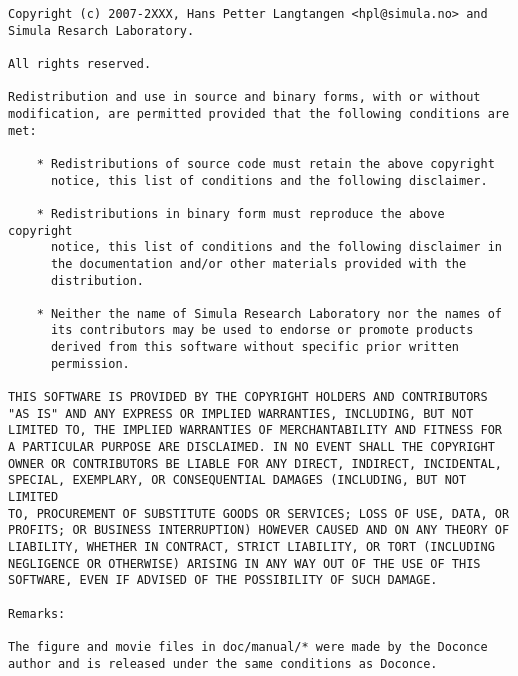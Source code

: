 \documentclass[%
oneside,                 %
final,                   %
chapterprefix=true,      %
open=right,              %
10pt]{book}
\begin{document}
\begin{Verbatim}[numbers=none,fontsize=\fontsize{9pt}{9pt},baselinestretch=0.95]
Copyright (c) 2007-2XXX, Hans Petter Langtangen <hpl@simula.no> and
Simula Resarch Laboratory.

All rights reserved.

Redistribution and use in source and binary forms, with or without
modification, are permitted provided that the following conditions are
met:

    * Redistributions of source code must retain the above copyright
      notice, this list of conditions and the following disclaimer.

    * Redistributions in binary form must reproduce the above copyright
      notice, this list of conditions and the following disclaimer in
      the documentation and/or other materials provided with the
      distribution.

    * Neither the name of Simula Research Laboratory nor the names of
      its contributors may be used to endorse or promote products
      derived from this software without specific prior written
      permission.

THIS SOFTWARE IS PROVIDED BY THE COPYRIGHT HOLDERS AND CONTRIBUTORS
"AS IS" AND ANY EXPRESS OR IMPLIED WARRANTIES, INCLUDING, BUT NOT
LIMITED TO, THE IMPLIED WARRANTIES OF MERCHANTABILITY AND FITNESS FOR
A PARTICULAR PURPOSE ARE DISCLAIMED. IN NO EVENT SHALL THE COPYRIGHT
OWNER OR CONTRIBUTORS BE LIABLE FOR ANY DIRECT, INDIRECT, INCIDENTAL,
SPECIAL, EXEMPLARY, OR CONSEQUENTIAL DAMAGES (INCLUDING, BUT NOT LIMITED
TO, PROCUREMENT OF SUBSTITUTE GOODS OR SERVICES; LOSS OF USE, DATA, OR
PROFITS; OR BUSINESS INTERRUPTION) HOWEVER CAUSED AND ON ANY THEORY OF
LIABILITY, WHETHER IN CONTRACT, STRICT LIABILITY, OR TORT (INCLUDING
NEGLIGENCE OR OTHERWISE) ARISING IN ANY WAY OUT OF THE USE OF THIS
SOFTWARE, EVEN IF ADVISED OF THE POSSIBILITY OF SUCH DAMAGE.

Remarks:

The figure and movie files in doc/manual/* were made by the Doconce
author and is released under the same conditions as Doconce.


\end{Verbatim}

\end{document}
